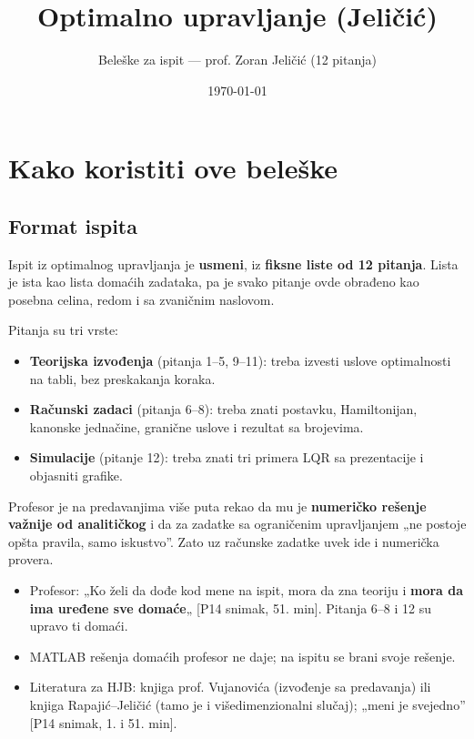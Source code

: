 \documentclass[11pt,a4paper,parskip=half,headsepline,numbers=noenddot]{scrartcl}
\title{Optimalno upravljanje (Jeličić)}
\subtitle{Beleške za ispit --- prof. Zoran Jeličić (12 pitanja)}
\author{}
\date{\today}
\DeclareRobustCommand{\izvor}[1]{{\small\color{izvorC}[#1]}}
\begin{document}
\maketitle
\thispagestyle{plain.scrheadings}
\tableofcontents
\clearpage

\section{Kako koristiti ove beleške}

\subsection{Format ispita}

Ispit iz optimalnog upravljanja je \textbf{usmeni}, iz \textbf{fiksne liste od 12 pitanja}. Lista je ista kao lista domaćih zadataka, pa je svako pitanje ovde obrađeno kao posebna celina, redom i sa zvaničnim naslovom.

Pitanja su tri vrste:

\begin{itemize}
\item \textbf{Teorijska izvođenja} (pitanja 1--5, 9--11): treba izvesti uslove optimalnosti na tabli, bez preskakanja koraka.
\item \textbf{Računski zadaci} (pitanja 6--8): treba znati postavku, Hamiltonijan, kanonske jednačine, granične uslove i rezultat sa brojevima.
\item \textbf{Simulacije} (pitanje 12): treba znati tri primera LQR sa prezentacije i objasniti grafike.
\end{itemize}

Profesor je na predavanjima više puta rekao da mu je \textbf{numeričko rešenje važnije od analitičkog} i da za zadatke sa ograničenim upravljanjem „ne postoje opšta pravila, samo iskustvo''. Zato uz računske zadatke uvek ide i numerička provera.

\begin{ispit}
\begin{itemize}
\item Profesor: „Ko želi da dođe kod mene na ispit, mora da zna teoriju i \textbf{mora da ima uređene sve domaće}„ \izvor{P14 snimak, 51. min}. Pitanja 6--8 i 12 su upravo ti domaći.
\item MATLAB rešenja domaćih profesor ne daje; na ispitu se brani svoje rešenje.
\item Literatura za HJB: knjiga prof. Vujanovića (izvođenje sa predavanja) ili knjiga Rapajić--Jeličić (tamo je i višedimenzionalni slučaj); „meni je svejedno'' \izvor{P14 snimak, 1. i 51. min}.
\end{itemize}
\end{ispit}
\end{document}
